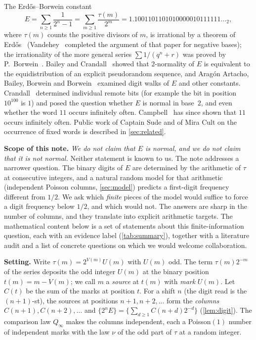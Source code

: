\documentclass[11pt]{article}
\newcommand{\Qinf}{{Q_\infty}}
\begin{document}
The Erd\H{o}s--Borwein constant
\[
E=\sum_{n\ge1}\frac1{2^n-1}=\sum_{m\ge1}\frac{\tau(m)}{2^m}=1.1001101101010000010111111\ldots_2,
\]
where $\tau(m)$ counts the positive divisors of $m$, is irrational by a theorem of Erd\H{o}s~\cite{erdos1948} (Vandehey~\cite{vandehey2013} completed the argument of that paper for negative bases); the irrationality of the more general series $\sum 1/(q^n+r)$ was proved by P.~Borwein~\cite{borwein1991,borwein1992}. Bailey and Crandall~\cite{baileycrandall2002} showed that $2$-normality of $E$ is equivalent to the equidistribution of an explicit pseudorandom sequence, and Arag\'on Artacho, Bailey, Borwein and Borwein~\cite{aabb2013} examined digit walks of $E$ and other constants. Crandall~\cite{crandall2012} determined individual remote bits (for example the bit in position $10^{100}$ is $1$) and posed the question whether $E$ is normal in base~$2$, and even whether the word $11$ occurs infinitely often. Campbell~\cite{campbell2026} has since shown that $11$ occurs infinitely often. Public work of Captain Sude and of Mira Cult on the occurrence of fixed words is described in \cref{sec:related}.

\medskip\noindent\textbf{Scope of this note.} \emph{We do not claim that $E$ is normal, and we do not claim that it is not normal.} Neither statement is known to us. The note addresses a narrower question. The binary digits of $E$ are determined by the arithmetic of $\tau$ at consecutive integers, and a natural random model for that arithmetic (independent Poisson columns, \cref{sec:model}) predicts a first-digit frequency different from $1/2$. We ask which \emph{finite} pieces of the model would suffice to force a digit frequency below $1/2$, and which would not. The answers are sharp in the number of columns, and they translate into explicit arithmetic targets. The mathematical content below is a set of statements about this finite-information question, each with an evidence label (\cref{tab:summary}), together with a literature audit and a list of concrete questions on which we would welcome collaboration.

\medskip\noindent\textbf{Setting.} Write $\tau(m)=2^{V(m)}U(m)$ with $U(m)$ odd. The term $\tau(m)2^{-m}$ of the series deposits the odd integer $U(m)$ at the binary position $t(m)=m-V(m)$; we call $m$ a \emph{source} at $t(m)$ with \emph{mark} $U(m)$. Let $C(t)$ be the sum of the marks at position $t$. For a shift $n$ (the digit read is the $(n{+}1)$-st), the sources at positions $n+1,n+2,\ldots$ form the \emph{columns} $C(n+1),C(n+2),\ldots$ and
$\{2^nE\}=\{\sum_{d\ge1}C(n+d)2^{-d}\}$ (\cref{lem:digit}). The comparison law $\Qinf$ makes the columns independent, each a Poisson$(1)$ number of independent marks with the law $\nu$ of the odd part of $\tau$ at a random integer.
\end{document}

